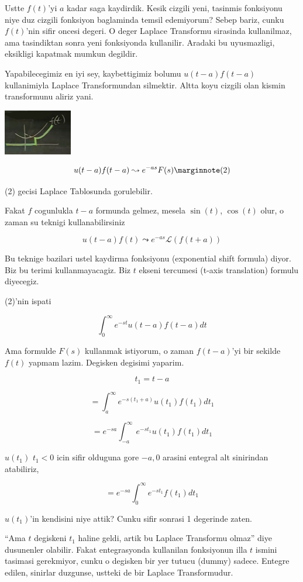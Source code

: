 \documentclass[12pt,fleqn]{article}\usepackage{../common}
\begin{document}
Ustte $f(t)$'yi $a$ kadar saga kaydirdik. Kesik cizgili yeni, tasinmis
fonksiyonu niye duz cizgili fonksiyon baglaminda temsil edemiyorum? Sebep
bariz, cunku $f(t)$'nin sifir oncesi degeri. O deger Laplace Transformu
sirasinda kullanilmaz, ama tasindiktan sonra yeni fonksiyonda
kullanilir. Aradaki bu uyusmazligi, eksikligi kapatmak mumkun degildir. 

Yapabilecegimiz en iyi sey, kaybettigimiz bolumu $u(t-a)f(t-a)$ kullanimiyla
Laplace Transformundan silmektir. Altta koyu cizgili olan kismin
transformunu aliriz yani.

\includegraphics[height=2cm]{22_8.png}

\[ u(t-a)f(t-a) \leadsto e^{-as}F(s) 
\mlabel{2}
\]

(2) gecisi Laplace Tablosunda gorulebilir.

Fakat $f$ cogunlukla $t-a$ formunda gelmez, mesela $\sin(t)$, $\cos(t)$
olur, o zaman su teknigi kullanabilirsiniz

\[ u(t-a)f(t) \leadsto e^{-as}\mathcal{L}(f(t+a)) \]

Bu teknige bazilari ustel kaydirma fonksiyonu (exponential shift formula)
diyor. Biz bu terimi kullanmayacagiz. Biz $t$ ekseni tercumesi (t-axis
translation) formulu diyecegiz. 

(2)'nin ispati

\[ \int_{0}^{\infty}e^{-st}u(t-a)f(t-a) dt \]

Ama formulde $F(s)$ kullanmak istiyorum, o zaman $f(t-a)$'yi bir sekilde
$f(t)$ yapmam lazim. Degisken degisimi yaparim. 

\[ t_1 = t-a \]

\[ = \int_{a}^{\infty}e^{-s(t_1+a)}u(t_1)f(t_1) dt_1 \]

\[ = e^{-sa} \int_{-a}^{\infty}e^{-st_1}u(t_1)f(t_1) dt_1 \]

$u(t_1)$ $t_1<0$ icin sifir olduguna gore $-a,0$ arasini entegral alt
sinirindan atabiliriz, 

\[ = e^{-sa} \int_{0}^{\infty}e^{-st_1}f(t_1) dt_1 \]

$u(t_1)$'in kendisini niye attik? Cunku sifir sonrasi 1 degerinde zaten. 

``Ama $t$ degiskeni $t_1$ haline geldi, artik bu Laplace Transformu olmaz''
diye dusunenler olabilir. Fakat entegrasyonda kullanilan fonksiyonun illa
$t$ ismini tasimasi gerekmiyor, cunku o degisken bir yer tutucu (dummy)
sadece. Entegre edilen, sinirlar duzgunse, ustteki de bir Laplace
Transformudur.
\end{document}

